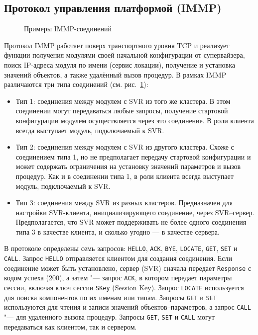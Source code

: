 \subsection{Протокол управления платформой (IMMP)}\label{sec:ch5_immp}

\begin{figure}[ht]
  \caption{Примеры IMMP-соединений}
  \label{fig:ch5_immp_connections}
\end{figure}

Протокол IMMP работает поверх транспортного уровня TCP и реализует функции получения модулями своей начальной конфигурации от супервайзера, поиск IP-адреса модуля по имени (сервис локации), получение и установка значений объектов, а также удалённый вызов процедур. В рамках IMMP различаются три типа соединений (см. рис.~\ref{fig:ch5_immp_connections}):

\begin{itemize}
	\item Тип 1: соединения между модулем с SVR из того же кластера. В этом соединении могут передаваться любые запросы, получение стартовой конфигурации модулем осуществляется через это соединение. В роли клиента всегда выступает модуль, подключаемый к SVR.
	\item Тип 2: соединения между модулем с SVR из другого кластера. Схоже с соединением типа 1, но не предполагает передачу стартовой конфигурации и может содержать ограничения на установку значений параметров и вызов процедур. Как и в соединении типа 1, в роли клиента всегда выступает модуль, подключаемый к SVR.
	\item Тип 3: соединения между SVR из разных кластеров. Предназначен для настройки SVR-клиента, инициализирующего соединение, через SVR--сервер. Предполагается, что SVR может поддерживать не более одного соединения типа 3 в качестве клиента, и сколько угодно --- в качестве сервера.
\end{itemize}

В протоколе определены семь запросов: \texttt{HELLO}, \texttt{ACK}, \texttt{BYE}, \texttt{LOCATE}, \texttt{GET}, \texttt{SET} и \texttt{CALL}. Запрос \texttt{HELLO} отправляется клиентом для создания соединения. Если соединение может быть установлено, сервер (SVR) сначала передает \texttt{Response} с кодом успеха (200), а затем "--- запрос \texttt{ACK}, в котором передает параметры сессии, включая ключ сессии \texttt{SKey} (Session Key). Запрос \texttt{LOCATE} используется для поиска компонентов по их именам или типам. Запросы \texttt{GET} и \texttt{SET} используются для чтения и записи значений объектов--параметров, а запрос \texttt{CALL} "--- для удаленного вызова процедур. Запросы \texttt{GET}, \texttt{SET} и \texttt{CALL} могут передаваться как клиентом, так и сервером.

